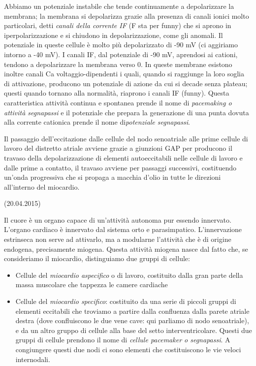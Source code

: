 \documentclass[a4paper,12pt]{article}
\begin{document}
 Abbiamo un potenziale instabile che tende continuamente a depolarizzare la membrana; la membrana si depolarizza grazie alla presenza di canali ionici molto particolari, detti \emph{canali della corrente IF} (F sta per funny) che si aprono in iperpolarizzazione e si chiudono in depolarizzazione, come gli anomali. Il potenziale in queste cellule è molto più depolarizzato di -90 mV (ci aggiriamo intorno a -40 mV). I canali IF, dal potenziale di -90 mV, aprendosi ai cationi, tendono a depolarizzare la membrana verso 0. In queste membrane esistono inoltre canali Ca voltaggio-dipendenti i quali, quando si raggiunge la loro soglia di attivazione, producono un potenziale di azione da cui si decade senza plateau; questi quando tornano alla normalità, riaprono i canali IF (funny). Questa caratteristica attività continua e spontanea prende il nome di \emph{pacemaking o attività segnapassi} e il potenziale che prepara la generazione di una punta dovuta alla corrente cationica prende il nome di\emph{potenziale segnapassi}.

Il passaggio dell'eccitazione dalle cellule del nodo senoatriale alle prime cellule di lavoro del distretto atriale avviene grazie a giunzioni GAP per producono il travaso della depolarizzazione di elementi autoeccitabili nelle cellule di lavoro e dalle prime a contatto, il travaso avviene per passaggi successivi, costituendo un'onda progressiva che si propaga a macchia d'olio in tutte le direzioni all'interno del miocardio. 

(20.04.2015)

Il cuore è un organo capace di un'attività autonoma pur essendo innervato. L'organo cardiaco è innervato dal sistema orto e parasimpatico. L'innervazione estrinseca non serve ad attivarlo, ma a modularne l'attività che è di origine endogena, precisamente miogena. Questa attività miogena nasce dal fatto che, se consideriamo il miocardio, distinguiamo due gruppi di cellule: 
\begin{itemize}
\item{Cellule del \emph{miocardio aspecifico} o di lavoro, costituito dalla gran parte della massa muscolare che tappezza le camere cardiache} 
\item{Cellule del \emph{miocardio specifico}: costituito da una serie di piccoli gruppi di elementi eccitabili che troviamo a partire dalla confluenza dalla parete atriale destra (dove confluiscono le due vene cave: qui parliamo di nodo senoatriale), e da un altro gruppo di cellule alla base del setto interventricolare. Questi due gruppi di cellule prendono il nome di \emph{cellule pacemaker o segnapassi}. A congiungere questi due nodi ci sono elementi che costituiscono le vie veloci internodali.}
\end{itemize}
\end{document}
